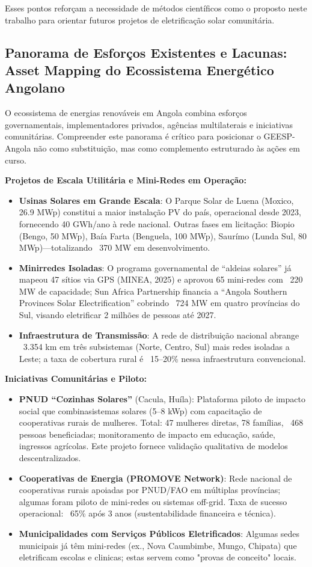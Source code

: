 \documentclass[12pt, a4paper]{article}
\begin{document}
Esses pontos reforçam a necessidade de métodos científicos como o proposto neste trabalho para orientar futuros projetos de eletrificação solar comunitária.

\subsection{Panorama de Esforços Existentes e Lacunas: Asset Mapping do Ecossistema Energético Angolano}

O ecossistema de energias renováveis em Angola combina esforços governamentais, implementadores privados, agências multilaterais e iniciativas comunitárias. Compreender este panorama é crítico para posicionar o GEESP-Angola não como substituição, mas como complemento estruturado às ações em curso.

\textbf{Projetos de Escala Utilitária e Mini-Redes em Operação:}
\begin{itemize}
\item \textbf{Usinas Solares em Grande Escala}: O Parque Solar de Luena (Moxico, 26.9 MWp) constitui a maior instalação PV do país, operacional desde 2023, fornecendo 40 GWh/ano à rede nacional. Outras fases em licitação: Biopio (Bengo, 50 MWp), Baía Farta (Benguela, 100 MWp), Saurímo (Lunda Sul, 80 MWp)—totalizando ~370 MW em desenvolvimento.
\item \textbf{Minirredes Isoladas}: O programa governamental de ``aldeias solares'' já mapeou 47 sítios via GPS (MINEA, 2025) e aprovou 65 mini-redes com ~220 MW de capacidade; Sun Africa Partnership financia a ``Angola Southern Provinces Solar Electrification'' cobrindo ~724 MW em quatro províncias do Sul, visando eletrificar 2 milhões de pessoas até 2027.
\item \textbf{Infraestrutura de Transmissão}: A rede de distribuição nacional abrange ~3.354 km em três subsistemas (Norte, Centro, Sul) mais redes isoladas a Leste; a taxa de cobertura rural é ~15--20\% nessa infraestrutura convencional.
\end{itemize}

\textbf{Iniciativas Comunitárias e Piloto:}
\begin{itemize}
\item \textbf{PNUD ``Cozinhas Solares''}  (Cacula, Huíla): Plataforma piloto de impacto social que combinasistemas solares (5--8 kWp) com capacitação de cooperativas rurais de mulheres. Total: 47 mulheres diretas, 78 famílias, ~468 pessoas beneficiadas; monitoramento de impacto em educação, saúde, ingressos agrícolas. Este projeto fornece validação qualitativa de modelos descentralizados.
\item \textbf{Cooperativas de Energia (PROMOVE Network)}: Rede nacional de cooperativas rurais apoiadas por PNUD/FAO em múltiplas províncias; algumas foram piloto de mini-redes ou sistemas off-grid. Taxa de sucesso operacional: ~65\% após 3 anos (sustentabilidade financeira e técnica).
\item \textbf{Municipalidades com Serviços Públicos Eletrificados}: Algumas sedes municipais já têm mini-redes (ex., Nova Caumbimbe, Mungo, Chipata) que eletrificam escolas e clinicas; estas servem como "provas de conceito" locais.
\end{itemize}
\end{document}
